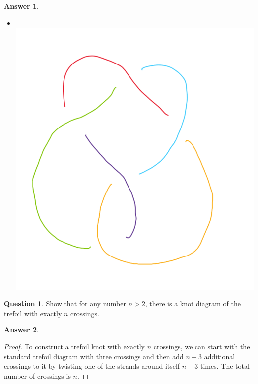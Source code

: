 \documentclass[article, 12pt]{article}
\theoremstyle{definition}
\newtheorem{question}{Question}
\newtheorem{answer}{Answer}
\begin{document}
\begin{answer}
\begin{itemize}
            \item \ \\ \includegraphics[scale=.2]{pret.png}
        \end{itemize}
    \end{answer}

    \begin{question}
        Show that for any number $n > 2$, there is a knot diagram of the trefoil with exactly $n$ crossings.    
    \end{question}
    \begin{answer}
        \begin{proof}
            To construct a trefoil knot with exactly $n$ crossings, we can start with the standard trefoil diagram with three crossings and then add $n-3$ additional crossings to it by twisting one of the strands around itself $n-3$ times. The total number of crossings is $n$.
        \end{proof}
    \end{answer}
\end{document}
